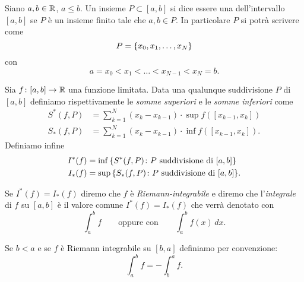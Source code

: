 \begin{definition}
\mymark{***}
Siano $a,b\in \mathbb R$, $a \le b$.
Un insieme $P\subset [a,b]$ si dice essere una 
dell'intervallo $[a,b]$ se $P$ è un insieme finito tale che $a,b\in P$.
In particolare $P$ si
potrà scrivere come
\[
 P = {\left\{  x_0, x_1, \dots, x_N \right\}}
\]
con
\[
  a = x_0 < x_1 < \dots < x_{N-1} < x_N = b.
\]

Sia $f\colon [a,b] \to \mathbb R$ una funzione limitata.
Data una qualunque suddivisione $P$ di $[a,b]$ definiamo
rispettivamente le \emph{somme superiori} e le \emph{somme inferiori}
come
\begin{align*}
S^*(f,P)
&= \sum_{k=1}^N (x_k - x_{k-1}) \cdot \sup f([x_{k-1},x_k]) \\
S_*(f,P)
&= \sum_{k=1}^N (x_k - x_{k-1}) \cdot \inf f([x_{k-1},x_k]).
\end{align*}
Definiamo infine
\begin{align*}
  I^*(f) &= \inf {\left\{ S^*(f,P) \colon \text{$P$ suddivisione di $[a,b]$} \right\}}
  \\
  I_*(f) &= \sup {\left\{ S_*(f,P) \colon \text{$P$ suddivisione di $[a,b]$} \right\}}.
\end{align*}

Se $I^*(f) = I_*(f)$ diremo che $f$ è
\emph{Riemann-integrabile}
%
%
%
%
%
e diremo che l'\emph{integrale} di $f$ su $[a,b]$ è
il valore comune $I^*(f)=I_*(f)$ che verrà denotato con
\[
  \int_a^b f
  \qquad{\text{oppure con}} \qquad
  \int_a^b f(x)\, dx.
\]

Se $b<a$ e se $f$ è Riemann integrabile su $[b,a]$
definiamo per convenzione:
\[
  \int_a^b f = -\int_b^a f.
\]
\end{definition}

